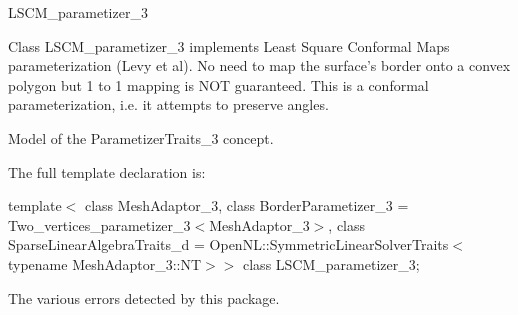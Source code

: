 

\begin{ccRefClass}{LSCM_parametizer_3}  %


\ccDefinition
  

Class LSCM\_parametizer\_3 implements Least Square Conformal Maps parameterization (Levy et al). No need to map the surface's border onto a convex polygon but 1 to 1 mapping is NOT guaranteed. This is a conformal parameterization, i.e. it attempts to preserve angles.


\ccIsModel

Model of the ParametizerTraits\_3 concept.



\ccParameters

The full template declaration is:

template$<$
class MeshAdaptor\_3, 
class BorderParametizer\_3 = Two\_vertices\_parametizer\_3$<$MeshAdaptor\_3$>$, 
class SparseLinearAlgebraTraits\_d = OpenNL::SymmetricLinearSolverTraits$<$typename MeshAdaptor\_3::NT$>$$>$ 
class LSCM\_parametizer\_3;


\ccTypes


{
}
{
The various errors detected by this package.
}
{
}
{
}
{
}
{
}
{
}
{
}
{
}
{
}
{
}
{
}
{
}
{
}
{
}
{
}
{
}
{
}
{
}
{
}
{
}
{
}
{
}
{
}
{
}



\end{ccRefClass}
